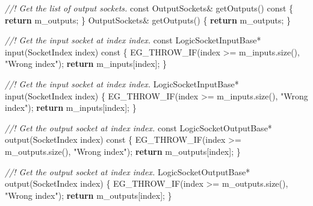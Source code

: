 \documentclass[
  british,
  12pt,
  paper=a4,
  twoside,
  titlepage=true,
  openright,
  abstract=on,
  toc=listofnumbered,
  numbers=noenddot,
  chapterprefix=true,
  headings=optiontohead,
  svgnames,
  dvipsnames]{scrreprt}
\newenvironment{Shaded}{}{}
\newcommand{\AttributeTok}[1]{\textcolor[rgb]{0.49,0.56,0.16}{#1}}
\newcommand{\CommentTok}[1]{\textcolor[rgb]{0.38,0.63,0.69}{\textit{#1}}}
\newcommand{\ControlFlowTok}[1]{\textcolor[rgb]{0.00,0.44,0.13}{\textbf{#1}}}
\newcommand{\NormalTok}[1]{#1}
\newcommand{\OperatorTok}[1]{\textcolor[rgb]{0.40,0.40,0.40}{#1}}
\newcommand{\StringTok}[1]{\textcolor[rgb]{0.25,0.44,0.63}{#1}}
\newcommand{\VariableTok}[1]{\textcolor[rgb]{0.10,0.09,0.49}{#1}}
\begin{document}
\begin{Shaded}
\begin{Highlighting}[numbers=left,,]
    \CommentTok{//! Get the list of output sockets.}
    \AttributeTok{const}\NormalTok{ OutputSockets}\OperatorTok{\&}\NormalTok{ getOutputs}\OperatorTok{()} \AttributeTok{const} \OperatorTok{\{} \ControlFlowTok{return} \VariableTok{m\_outputs}\OperatorTok{;} \OperatorTok{\}}
\NormalTok{    OutputSockets}\OperatorTok{\&}\NormalTok{ getOutputs}\OperatorTok{()} \OperatorTok{\{} \ControlFlowTok{return} \VariableTok{m\_outputs}\OperatorTok{;} \OperatorTok{\}}

    \CommentTok{//! Get the input socket at index \textasciigrave{}index\textasciigrave{}.}
    \AttributeTok{const}\NormalTok{ LogicSocketInputBase}\OperatorTok{*}\NormalTok{ input}\OperatorTok{(}\NormalTok{SocketIndex index}\OperatorTok{)} \AttributeTok{const}
    \OperatorTok{\{}
\NormalTok{        EG\_THROW\_IF}\OperatorTok{(}\NormalTok{index }\OperatorTok{\textgreater{}=} \VariableTok{m\_inputs}\OperatorTok{.}\NormalTok{size}\OperatorTok{(),} \StringTok{"Wrong index"}\OperatorTok{);}
        \ControlFlowTok{return} \VariableTok{m\_inputs}\OperatorTok{[}\NormalTok{index}\OperatorTok{];}
    \OperatorTok{\}}

    \CommentTok{//! Get the input socket at index \textasciigrave{}index\textasciigrave{}.}
\NormalTok{    LogicSocketInputBase}\OperatorTok{*}\NormalTok{ input}\OperatorTok{(}\NormalTok{SocketIndex index}\OperatorTok{)}
    \OperatorTok{\{}
\NormalTok{        EG\_THROW\_IF}\OperatorTok{(}\NormalTok{index }\OperatorTok{\textgreater{}=} \VariableTok{m\_inputs}\OperatorTok{.}\NormalTok{size}\OperatorTok{(),} \StringTok{"Wrong index"}\OperatorTok{);}
        \ControlFlowTok{return} \VariableTok{m\_inputs}\OperatorTok{[}\NormalTok{index}\OperatorTok{];}
    \OperatorTok{\}}

    \CommentTok{//! Get the output socket at index \textasciigrave{}index\textasciigrave{}.}
    \AttributeTok{const}\NormalTok{ LogicSocketOutputBase}\OperatorTok{*}\NormalTok{ output}\OperatorTok{(}\NormalTok{SocketIndex index}\OperatorTok{)} \AttributeTok{const}
    \OperatorTok{\{}
\NormalTok{        EG\_THROW\_IF}\OperatorTok{(}\NormalTok{index }\OperatorTok{\textgreater{}=} \VariableTok{m\_outputs}\OperatorTok{.}\NormalTok{size}\OperatorTok{(),} \StringTok{"Wrong index"}\OperatorTok{);}
        \ControlFlowTok{return} \VariableTok{m\_outputs}\OperatorTok{[}\NormalTok{index}\OperatorTok{];}
    \OperatorTok{\}}

    \CommentTok{//! Get the output socket at index \textasciigrave{}index\textasciigrave{}.}
\NormalTok{    LogicSocketOutputBase}\OperatorTok{*}\NormalTok{ output}\OperatorTok{(}\NormalTok{SocketIndex index}\OperatorTok{)}
    \OperatorTok{\{}
\NormalTok{        EG\_THROW\_IF}\OperatorTok{(}\NormalTok{index }\OperatorTok{\textgreater{}=} \VariableTok{m\_outputs}\OperatorTok{.}\NormalTok{size}\OperatorTok{(),} \StringTok{"Wrong index"}\OperatorTok{);}
        \ControlFlowTok{return} \VariableTok{m\_outputs}\OperatorTok{[}\NormalTok{index}\OperatorTok{];}
    \OperatorTok{\}}


\end{Highlighting}
\end{Shaded}
\end{document}
